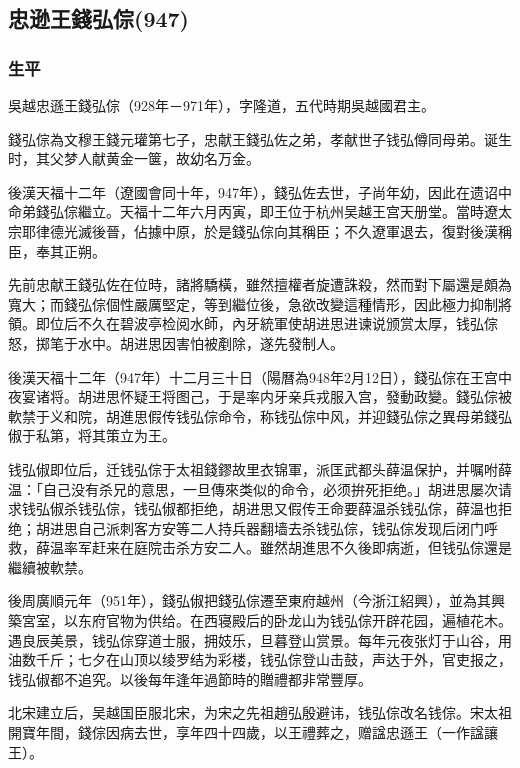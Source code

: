 
\subsection{忠逊王錢弘倧\tiny(947)}

\subsubsection{生平}

吳越忠遜王錢弘倧（928年－971年），字隆道，五代時期吳越國君主。

錢弘倧為文穆王錢元瓘第七子，忠献王錢弘佐之弟，孝献世子钱弘僔同母弟。诞生时，其父梦人献黄金一箧，故幼名万金。

後漢天福十二年（遼國會同十年，947年），錢弘佐去世，子尚年幼，因此在遗诏中命弟錢弘倧繼立。天福十二年六月丙寅，即王位于杭州吴越王宫天册堂。當時遼太宗耶律德光滅後晉，佔據中原，於是錢弘倧向其稱臣；不久遼軍退去，復對後漢稱臣，奉其正朔。

先前忠献王錢弘佐在位時，諸將驕橫，雖然擅權者旋遭誅殺，然而對下屬還是頗為寬大；而錢弘倧個性嚴厲堅定，等到繼位後，急欲改變這種情形，因此極力抑制將領。即位后不久在碧波亭检阅水師，內牙統軍使胡进思进谏说颁赏太厚，钱弘倧怒，掷笔于水中。胡进思因害怕被剷除，遂先發制人。

後漢天福十二年（947年）十二月三十日（陽曆為948年2月12日），錢弘倧在王宫中夜宴诸将。胡进思怀疑王将图己，于是率内牙亲兵戎服入宫，發動政變。錢弘倧被軟禁于义和院，胡進思假传钱弘倧命令，称钱弘倧中风，并迎錢弘倧之異母弟錢弘俶于私第，将其策立为王。

钱弘俶即位后，迁钱弘倧于太祖錢鏐故里衣锦軍，派匡武都头薛温保护，并嘱咐薛温：「自己没有杀兄的意思，一旦傳來类似的命令，必须拚死拒绝。」胡进思屡次请求钱弘俶杀钱弘倧，钱弘俶都拒绝，胡进思又假传王命要薛温杀钱弘倧，薛温也拒绝；胡进思自己派刺客方安等二人持兵器翻墙去杀钱弘倧，钱弘倧发现后闭门呼救，薛温率军赶来在庭院击杀方安二人。雖然胡進思不久後即病逝，但钱弘倧還是繼續被軟禁。

後周廣順元年（951年），錢弘俶把錢弘倧遷至東府越州（今浙江紹興），並為其興築宮室，以东府官物为供给。在西寝殿后的卧龙山为钱弘倧开辟花园，遍植花木。遇良辰美景，钱弘倧穿道士服，拥妓乐，旦暮登山赏景。每年元夜张灯于山谷，用油数千斤；七夕在山顶以绫罗结为彩楼，钱弘倧登山击鼓，声达于外，官吏报之，钱弘俶都不追究。以後每年逢年過節時的贈禮都非常豐厚。

北宋建立后，吴越国臣服北宋，为宋之先祖趙弘殷避讳，钱弘倧改名钱倧。宋太祖開寶年間，錢倧因病去世，享年四十四歲，以王禮葬之，赠諡忠遜王（一作諡讓王）。

